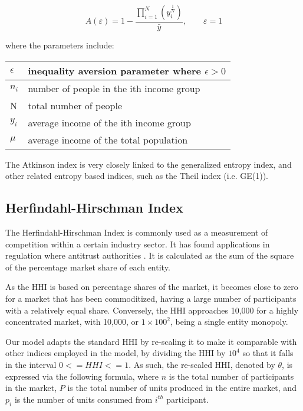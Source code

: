 \documentclass[conference]{IEEEtran}
\begin{document}
\[A\left( \varepsilon \right)=1-\frac{\prod_{i=1}^{N}\left( y_{i}^{\frac{1}{N}} \right)}{\bar{y}}, \quad \quad \varepsilon=1\]

where the parameters include:

\begin{center}
\begin{tabular}{|l|l|}
\hline
$\epsilon$ & inequality aversion parameter where $\epsilon>0$ \\ \hline
$n_{i}$ & number of people in the ith income group \\ \hline
N & total number of people \\ \hline
$y_{i}$ & average income of the ith income group \\ \hline
$\mu$ & average income of the total population \\ \hline
\end{tabular}
\end{center}

The Atkinson index is very closely linked to the generalized entropy index, and other related entropy based indices, such as the Theil index (i.e. GE(1)).

\subsection{Herfindahl-Hirschman Index}

The Herfindahl-Hirschman Index is commonly used as a measurement of competition within a certain industry sector. It has found applications in regulation where antitrust authorities \cite{usdoj2015}. It is calculated as the sum of the square of the percentage market share of each entity.

As the HHI is based on percentage shares of the market, it becomes close to zero for a market that has been commoditized, having a large number of participants with a relatively equal share.  Conversely, the HHI approaches 10,000 for a highly concentrated market, with 10,000, or $1 \times 100^2 $, being a single entity monopoly.

Our model adapts the standard HHI by re-scaling it to make it comparable with other indices employed in the model, by dividing the HHI by $10^4$ so that it falls in the interval $0 <= HHI <= 1$. As such, the re-scaled HHI, denoted by $\theta$, is expressed via the following formula, where $n$ is the total number of participants in the market, $P$ is the total number of units produced in the entire market, and $p_i$ is the number of units consumed from $i^{th}$ participant.
\end{document}
